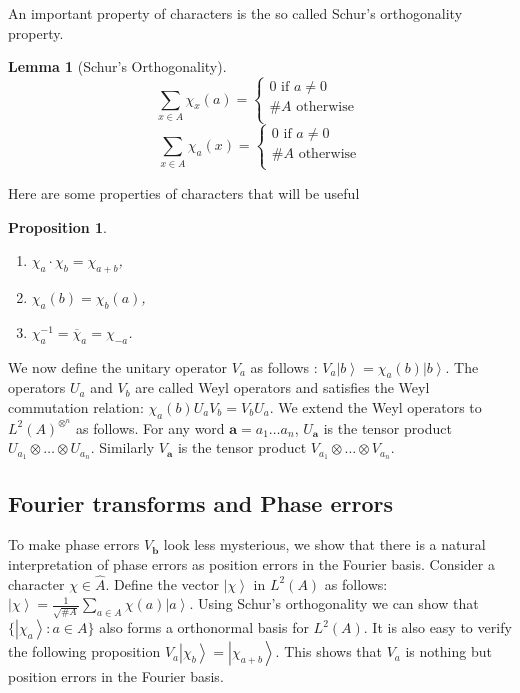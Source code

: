 \documentclass[11pt,twoside]{article}
\newtheorem{proposition}[theorem]{Proposition}
\newtheorem{lemma}[theorem]{Lemma}
\theoremstyle{definition}
\theoremstyle{remark}
\newcommand{\ket}[1]{\ensuremath{\left\vert #1 \right\rangle}}
\newcommand{\LN}[1]{\ensuremath{L^2\left(#1\right)^{\otimes^n}}}
\begin{document}
An important property of characters is the so called Schur's
orthogonality property.

\begin{lemma}[Schur's Orthogonality]\label{lem-schur-ortho}
  \begin{equation}
  \sum_{x \in A} \chi_x(a) = \left\{ \begin{array}{l}
      0 \textrm{ if } a \neq 0\\
      \# A \textrm{ otherwise }\\
    \end{array}
  \right.
  \end{equation}
  \begin{equation}
    \sum_{x \in A} \chi_a(x) = \left\{ \begin{array}{l}
        0 \textrm{ if } a \neq 0\\
        \# A \textrm{ otherwise}\\
      \end{array}
    \right.
  \end{equation}
\end{lemma}

Here are some properties of characters that will be useful

\begin{proposition}
  \begin{enumerate}
  \item $\chi_a \cdot \chi_b = \chi_{a+b}$,
  \item $\chi_a(b) = \chi_b(a)$,
  \item $\chi_{a}^{-1} = \overline{\chi}_a = \chi_{-a}$.
  \end{enumerate}
\end{proposition}

We now define the unitary operator $V_a$ as follows : $V_a \ket{b} =
\chi_a(b) \ket{b}$. The operators $U_a$ and $V_b$ are called Weyl
operators and satisfies the Weyl commutation relation: $\chi_a(b) U_a
V_b = V_b U_a$. We extend the Weyl operators to $\LN{A}$ as follows.
For any word $\mathbf{a} = a_1\ldots a_n$, $U_{\mathbf{a}}$ is the
tensor product $U_{a_1}\otimes\ldots\otimes U_{a_n}$. Similarly
$V_{\mathbf{a}}$ is the tensor product $V_{a_1}\otimes\ldots\otimes
V_{a_n}$.

\subsection*{Fourier transforms and Phase errors}

To make phase errors $V_{\mathbf{b}}$ look less mysterious, we show
that there is a natural interpretation of phase errors as position
errors in the Fourier basis.  Consider a character $\chi \in \hat{A}$.
Define the vector $\ket{\chi}$ in $L^2(A)$ as follows: $\ket{\chi} =
\frac{1}{\sqrt{\# A}} \sum_{a \in A} \chi(a) \ket{a}$. Using Schur's
orthogonality we can show that $\{ \ket{\chi_a} : a \in A \}$ also
forms a orthonormal basis for $L^2(A)$. It is also easy to verify the
following proposition $V_a \ket{\chi_b} = \ket{\chi_{a+b}}$. This
shows that $V_a$ is nothing but position errors in the Fourier basis.
\end{document}
